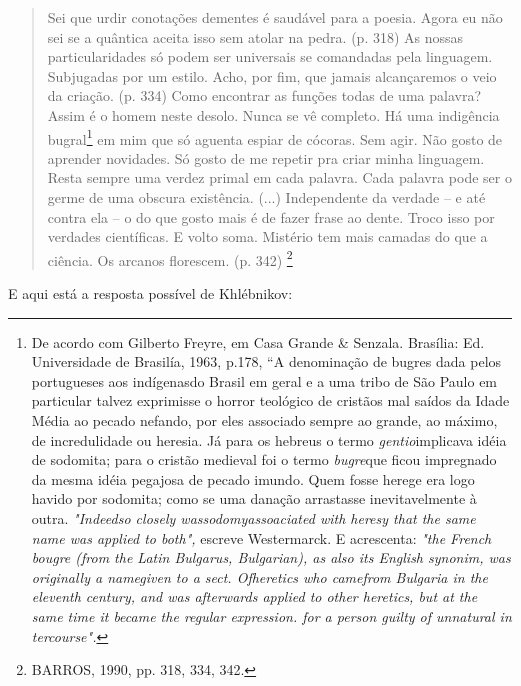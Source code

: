 \begin{quote}
Sei que urdir conotações dementes é saudável para a poesia. Agora eu não
sei se a quântica aceita isso sem atolar na pedra. (p. 318) As nossas
particularidades só podem ser universais se comandadas pela linguagem.
Subjugadas por um estilo. Acho, por fim, que jamais alcançaremos o veio
da criação. (p. 334) Como encontrar as funções todas de uma palavra?
Assim é o homem neste desolo. Nunca se vê completo. Há uma indigência
bugral\footnote{De acordo com Gilberto Freyre, em Casa Grande \&
  Senzala. Brasília: Ed. Universidade de Brasilía, 1963, p.178, ``A
  denominação de bugres dada pelos portugueses aos indígenasdo Brasil em
  geral e a uma tribo de São Paulo em particular talvez exprimisse o
  horror teológico de cristãos mal saídos da Idade Média ao pecado
  nefando, por eles associado sempre ao grande, ao máximo, de
  incredulidade ou heresia. Já para os hebreus o termo
  \emph{gentio}implicava idéia de sodomita; para o cristão medieval foi
  o termo \emph{bugre}que ficou impregnado da mesma idéia pegajosa de
  pecado imundo. Quem fosse herege era logo havido por sodomita; como se
  uma danação arrastasse inevitavelmente à outra. \emph{"Indeedso
  closely wassodomyassoaciated with heresy that the same name was
  applied to both",} escreve Westermarck. E acrescenta: \emph{"the
  French bougre (from the Latin Bulgarus, Bulgarian), as also its
  English synonim, was originally a namegiven to a sect. Ofheretics who
  camefrom Bulgaria in the eleventh century, and was afterwards applied
  to other heretics, but at the same time it became the regular
  expression. for a person guilty of unnatural in tercourse".}} em mim
que só aguenta espiar de cócoras. Sem agir. Não gosto de aprender
novidades. Só gosto de me repetir pra criar minha linguagem. Resta
sempre uma verdez primal em cada palavra. Cada palavra pode ser o germe
de uma obscura existência. (...) Independente da verdade -- e até contra
ela -- o do que gosto mais é de fazer frase ao dente. Troco isso por
verdades científicas. E volto soma. Mistério tem mais camadas do que a
ciência. Os arcanos florescem. (p. 342) \footnote{BARROS, 1990, pp. 318,
  334, 342.}
\end{quote}

E aqui está a resposta possível de Khlébnikov:

